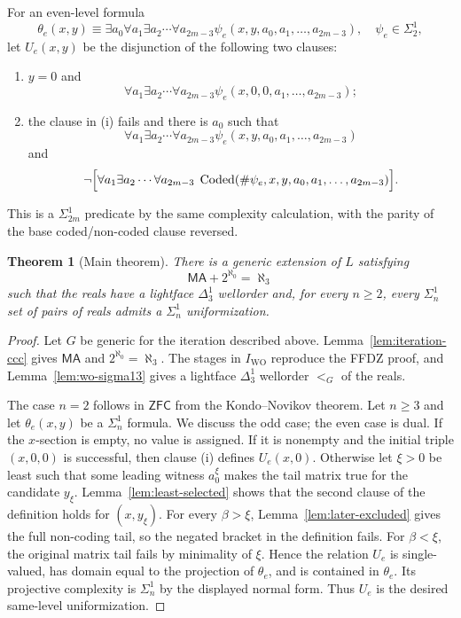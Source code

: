\documentclass[11pt]{article}
\theoremstyle{plain}
\newtheorem{theorem}{Theorem}[section]
\theoremstyle{definition}
\theoremstyle{remark}
\newcommand{\MA}{\mathsf{MA}}
\newcommand{\ZFC}{\mathsf{ZFC}}
\begin{document}
For an even-level formula
\[
\theta_e(x,y)\equiv \exists a_0\forall a_1\exists a_2\cdots\forall a_{2m-3}
\psi_e(x,y,a_0,a_1,\ldots,a_{2m-3}),
\quad \psi_e\in\Sigma^1_2,
\]
let $U_e(x,y)$ be the disjunction of the following two clauses:
\begin{enumerate}[label=(\roman*)]
\item $y=0$ and
\[
\forall a_1\exists a_2\cdots\forall a_{2m-3}
\psi_e(x,0,0,a_1,\ldots,a_{2m-3});
\]
\item the clause in (i) fails and there is $a_0$ such that
\[
\forall a_1\exists a_2\cdots\forall a_{2m-3}
\psi_e(x,y,a_0,a_1,\ldots,a_{2m-3})
\]
and
\[
\neg\Bigl[\forall a_1\exists a_2\cdots\forall a_{2m-3}\;
\operatorname{Coded}(\#\psi_e,x,y,a_0,a_1,\ldots,a_{2m-3})\Bigr].
\]
\end{enumerate}
This is a $\Sigma^1_{2m}$ predicate by the same complexity calculation, with the
parity of the base coded/non-coded clause reversed.

\begin{theorem}[Main theorem]\label{thm:main}
There is a generic extension of $L$ satisfying
\[
\MA+2^{\aleph_0}=\aleph_3
\]
such that the reals have a lightface $\Delta^1_3$ wellorder and, for every
$n\geq 2$, every $\Sigma^1_n$ set of pairs of reals admits a $\Sigma^1_n$
uniformization.
\end{theorem}

\begin{proof}
Let $G$ be generic for the iteration described above.  Lemma~\ref{lem:iteration-ccc}
gives $\MA$ and $2^{\aleph_0}=\aleph_3$.  The stages in $I_{\mathrm{WO}}$ reproduce
the FFDZ proof, and Lemma~\ref{lem:wo-sigma13} gives a lightface $\Delta^1_3$
wellorder $<_G$ of the reals.

The case $n=2$ follows in $\ZFC$ from the Kondo--Novikov theorem.  Let $n\geq3$
and let $\theta_e(x,y)$ be a $\Sigma^1_n$ formula.  We discuss the odd case; the
even case is dual.  If the $x$-section is empty, no value is assigned.  If it is
nonempty and the initial triple $(x,0,0)$ is successful, then clause (i) defines
$U_e(x,0)$.  Otherwise let $\xi>0$ be least such that some leading witness
$a^\xi_0$ makes the tail matrix true for the candidate $y_\xi$.  Lemma~\ref{lem:least-selected}
shows that the second clause of the definition holds for $(x,y_\xi)$.
For every $\beta>\xi$, Lemma~\ref{lem:later-excluded} gives the full
non-coding tail, so the negated bracket in the definition fails.  For
$\beta<\xi$, the original matrix tail fails by minimality of $\xi$.  Hence the
relation $U_e$ is single-valued, has domain equal to the projection of
$\theta_e$, and is contained in $\theta_e$.  Its projective complexity is
$\Sigma^1_n$ by the displayed normal form.  Thus $U_e$ is the desired
same-level uniformization.
\end{proof}
\end{document}

